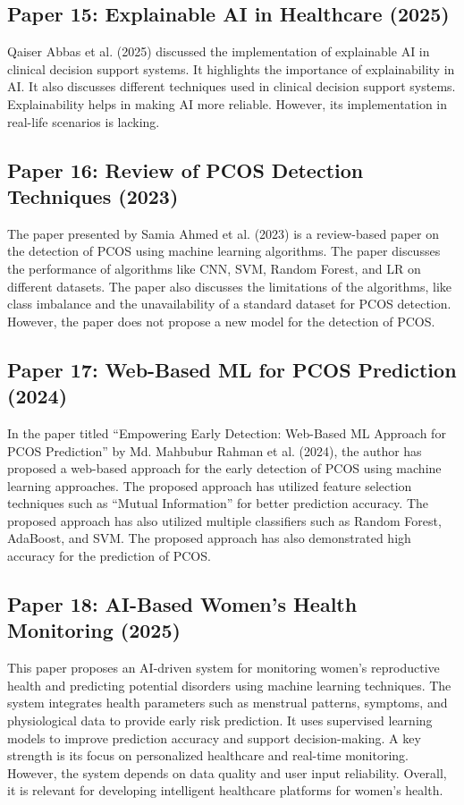 \subsection{Paper 15: Explainable AI in Healthcare (2025)}
Qaiser Abbas et al. (2025) discussed the implementation of explainable AI in clinical decision support systems. It highlights the importance of explainability in AI. It also discusses different techniques used in clinical decision support systems. Explainability helps in making AI more reliable. However, its implementation in real-life scenarios is lacking. \cite{abbas2025}

\subsection{Paper 16: Review of PCOS Detection Techniques (2023)}
The paper presented by Samia Ahmed et al. (2023) is a review-based paper on the detection of PCOS using machine learning algorithms. The paper discusses the performance of algorithms like CNN, SVM, Random Forest, and LR on different datasets. The paper also discusses the limitations of the algorithms, like class imbalance and the unavailability of a standard dataset for PCOS detection. However, the paper does not propose a new model for the detection of PCOS. \cite{ahmed2023}

\subsection{Paper 17: Web-Based ML for PCOS Prediction (2024)}
In the paper titled ``Empowering Early Detection: Web-Based ML Approach for PCOS Prediction'' by Md. Mahbubur Rahman et al. (2024), the author has proposed a web-based approach for the early detection of PCOS using machine learning approaches. The proposed approach has utilized feature selection techniques such as ``Mutual Information'' for better prediction accuracy. The proposed approach has also utilized multiple classifiers such as Random Forest, AdaBoost, and SVM. The proposed approach has also demonstrated high accuracy for the prediction of PCOS. \cite{rahman2024}

\subsection{Paper 18: AI-Based Women's Health Monitoring (2025)}
This paper proposes an AI-driven system for monitoring women's reproductive health and predicting potential disorders using machine learning techniques. The system integrates health parameters such as menstrual patterns, symptoms, and physiological data to provide early risk prediction. It uses supervised learning models to improve prediction accuracy and support decision-making. A key strength is its focus on personalized healthcare and real-time monitoring. However, the system depends on data quality and user input reliability. Overall, it is relevant for developing intelligent healthcare platforms for women's health. \cite{maity2025}

